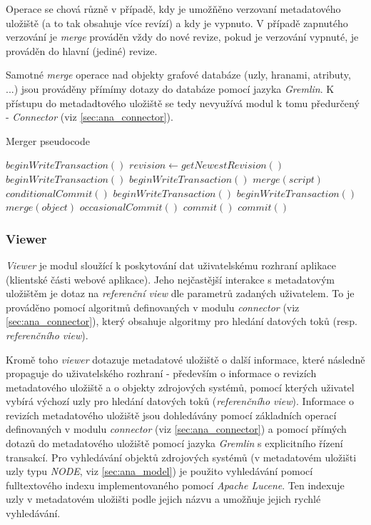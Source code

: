 Operace se chová různě v případě, kdy je umožňěno verzovaní metadatového uložiště (a to tak obsahuje více revízí) a kdy je vypnuto. V případě zapnutého verzování je \textit{merge} prováděn vždy do nové revize, pokud je verzování vypnuté, je prováděn do hlavní (jediné) revize.

Samotné \textit{merge} operace nad objekty grafové databáze (uzly, hranami, atributy, ...) jsou prováděny přímímy dotazy do databáze pomocí jazyka \textit{Gremlin}. K přístupu do metadadtového uložiště se tedy nevyužívá modul k tomu předurčený - \textit{Connector} (viz \ref{sec:ana_connector}).

\begin{algorithm}
\caption{Merger pseudocode}
\label{alg_merger}
\begin{algorithmic}
	\State $beginWriteTransaction()$
	\State $revision\gets getNewestRevision()$
		\State $beginWriteTransaction()$
			\State $beginWriteTransaction()$
			\State $merge(script)$
			\State $conditionalCommit()$
		\EndFor
		\State $beginWriteTransaction()$
			\State $beginWriteTransaction()$
			\State $merge(object)$
			\State $occasionalCommit()$
		\EndFor
		\State $commit()$
	\EndIf
	\State $commit()$
\end{algorithmic}
\end{algorithm}

\subsubsection{Viewer}
\label{sec:ana_viewer}
\textit{Viewer} je modul sloužící k poskytování dat uživatelskému rozhraní aplikace (klientské části webové aplikace). Jeho nejčastější interakce s metadatovým uložištěm je dotaz na \textit{referenční view} dle parametrů zadaných uživatelem. To je prováděno pomocí algoritmů definovaných v modulu \textit{connector} (viz \ref{sec:ana_connector}), který obsahuje algoritmy pro hledání datových toků (resp. \textit{referenčního view}).

Kromě toho \textit{viewer} dotazuje metadatové uložiště o další informace, které následně propaguje do uživatelského rozhraní - především o informace o revizích metadatového uložiště a o objekty zdrojových systémů, pomocí kterých uživatel vybírá výchozí uzly pro hledání datových toků (\textit{referenčního view}). Informace o revizích metadatového uložiště jsou dohledávány pomocí základních operací definovaných v modulu \textit{connector} (viz \ref{sec:ana_connector}) a pomocí přímých dotazů do metadatového uložiště pomocí jazyka \textit{Gremlin} s explicitního řízení transakcí. Pro vyhledávání objektů zdrojových systémů (v metadatovém uložišti uzly typu \textit{NODE}, viz \ref{sec:ana_model}) je použito vyhledávání pomocí fulltextového indexu implementovaného pomocí \textit{Apache Lucene}. Ten indexuje uzly v metadatovém uložišti podle jejich názvu a umožňuje jejich rychlé vyhledávání.


